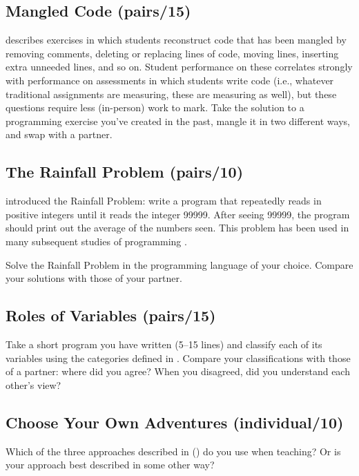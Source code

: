 \subsection*{Mangled Code (pairs/15)}

\cite{Chen2017} describes exercises in which students reconstruct
code that has been mangled by removing comments, deleting or replacing
lines of code, moving lines, inserting extra unneeded lines, and so on.
Student performance on these correlates strongly with performance on
assessments in which students write code (i.e., whatever traditional
assignments are measuring, these are measuring as well), but these
questions require less (in-person) work to mark. Take the solution to a
programming exercise you've created in the past, mangle it in two
different ways, and swap with a partner.

\subsection*{The Rainfall Problem (pairs/10)}

\cite{Solo1986} introduced the Rainfall Problem: write a program that
repeatedly reads in positive integers until it reads the integer 99999.
After seeing 99999, the program should print out the average of the
numbers seen. This problem has been used in many subsequent studies of
programming \cite{Fisl2014,Simo2013,Sepp2015}.

Solve the Rainfall Problem in the programming language of your choice.
Compare your solutions with those of your partner.

\subsection*{Roles of Variables (pairs/15)}

Take a short program you have written (5--15 lines) and classify each of
its variables using the categories defined in
. Compare your classifications with those
of a partner: where did you agree? When you disagreed, did you
understand each other's view?

\subsection*{Choose Your Own Adventures (individual/10)}

Which of the three approaches described in \cite{Sorv2014}
() do you use when teaching? Or is your approach
best described in some other way?

